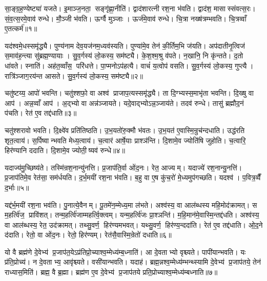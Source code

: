 
\clearpage
{}
\setcounter{anuvakam}{0}
सा॒ङ्ग्र॒ह॒ण्येष्ट्या॑ यजते। इ॒माञ्ज॒नता॒ सङ्गृ॑ह्णा॒नीति॑। द्वाद॑शारत्नी रश॒ना भ॑वति। द्वाद॑श॒ मासास्संवत्स॒रः। सं॒व॒त्स॒रमे॒वाव॑ रुन्धे। मौ॒ञ्जी भ॑वति। ऊर्ग्वै मुञ्जाः। ऊर्ज॑मे॒वाव॑ रुन्धे। चि॒त्रा नख्ष॑त्रम्भवति। चि॒त्रव्वाँ ए॒तत्कर्म॑॥१॥

यद॑श्वमे॒धस्समृ॑द्ध्यै। पुण्य॑नाम देव॒यज॑नम॒ध्यव॑स्यति। पुण्या॑मे॒व तेन॑ की॒र्तिम॒भि ज॑यति। अप॑दातीनृ॒त्विज॑ स॒माव॑ह॒न्त्या सु॑ब्रह्म॒ण्यायाः। सु॒व॒र्गस्य॑ लो॒कस्य॒ सम॑ष्ट्यै। के॒श॒श्म॒श्रु व॑पते। न॒खानि॒ नि कृ॑न्तते। द॒तो धा॑वते। स्नाति॑। अह॑त॒व्वाँस॒ परि॑धत्ते। पा॒प्मनोऽप॑हत्यै। वाचं॑ य॒त्वोप॑ वसति। सु॒व॒र्गस्य॑ लो॒कस्य॒ गुप्त्यै। रात्रि॑ञ्जाग॒रय॑न्त आसते। सु॒व॒र्गस्य॑ लो॒कस्य॒ सम॑ष्ट्यै॥२॥\anuvakamend[कर्म॑ धत्ते॒ पञ्च॑ च]

चतु॑ष्टय्य॒ आपो॑ भवन्ति। चतु॑श्शफो॒ वा अश्व॑ प्राजाप॒त्यस्समृ॑द्ध्यै। ता दि॒ग्भ्यस्स॒माभृ॑ता भवन्ति। दि॒ख्षु वा आप॑। अन्न॒व्वाँ आप॑। अ॒द्भ्यो वा अन्न॑ञ्जायते। यदे॒वाद्भ्योऽन्न॒ञ्जाय॑ते। तदव॑ रुन्धे। तासु॑ ब्रह्मौद॒नं प॑चति। रेत॑ ए॒व तद्द॑धाति॥३॥

चतु॑श्शरावो भवति। दि॒क्ष्वे॑व प्रति॑तिष्ठति। उ॒भ॒यतो॑रु॒क्मौ भ॑वतः। उ॒भ॒यत॑ ए॒वास्मि॒न्रुच॑न्दधाति। उद्ध॑रति शृत॒त्वाय॑। स॒र्पिष्वान्भवति मेध्य॒त्वाय॑। च॒त्वार॑ आर्\mbox{}षे॒याः प्राश्ञ॑न्ति। दि॒शामे॒व ज्योति॑षि जुहोति। च॒त्वारि॒ हिर॑ण्यानि ददाति। दि॒शामे॒व ज्योती॒ष्यव॑ रुन्धे॥४॥

यदाज्य॑मु॒च्छिष्य॑ते। तस्मि॑न्रश॒नान्यु॑नत्ति। प्र॒जाप॑ति॒र्वा ओ॑द॒नः। रेत॒ आज्यम्। यदाज्ये॑ रश॒नान्यु॒नत्ति॑। प्र॒जाप॑तिमे॒व रेत॑सा॒ सम॑र्धयति। द॒र्भ॒मयी॑ रश॒ना भ॑वति। ब॒हु वा ए॒ष कु॑च॒रो॑ मे॒ध्यमुप॑गच्छति। यदश्व॑। प॒वित्र॒व्वैँ द॒र्भाः॥५॥

यद्द॑र्भ॒मयी॑ रश॒ना भव॑ति। पु॒नात्ये॒वैनम्। पू॒तमे॑न॒म्मेध्य॒मा ल॑भते। अश्व॑स्य॒ वा आल॑ब्धस्य महि॒मोद॑क्रामत्। स म॒हर्त्वि॑ज॒ प्रावि॑शत्। तन्म॒हर्त्वि॑जाम्महर्त्वि॒क्त्वम्। यन्म॒हर्त्वि॑जः प्रा॒श्ञन्ति॑। म॒हि॒मान॑मे॒वास्मि॒न्तद्द॑धति। अश्व॑स्य॒ वा आल॑ब्धस्य॒ रेत॒ उद॑क्रामत्। तथ्सु॒वर्ण॒ हिर॑ण्यमभवत्। यथ्सु॒वर्ण॒ हिर॑ण्य॒न्ददा॑ति। रेत॑ ए॒व तद्द॑धाति। ओ॒द॒ने द॑दाति। रेतो॒ वा ओ॑द॒नः। रेतो॒ हिर॑ण्यम्। रेत॑सै॒वास्मि॒न्रेतो॑ दधाति॥६॥\anuvakamend[द॒धा॒ति॒ रु॒न्धे॒ द॒र्भा अ॑भव॒थ्षट् च॑]

यो वै ब्रह्म॑णे दे॒वेभ्य॑ प्र॒जाप॑त॒येऽप्र॑तिप्रो॒च्याश्व॒म्मेध्य॑म्ब॒ध्नाति॑। आ दे॒वताभ्यो वृश्च्यते। पापी॑यान्भवति। यः प्र॑ति॒प्रोच्य॑। न दे॒वताभ्य॒ आवृ॑श्च्यते। वसी॑यान्भवति। यदाह॑। ब्रह्म॒न्नश्व॒म्मेध्य॑म्भन्थ्स्यामि दे॒वेभ्य॑ प्र॒जाप॑तये॒ तेन॑ राध्यास॒मिति॑। ब्रह्म॒ वै ब्र॒ह्मा। ब्रह्म॑ण ए॒व दे॒वेभ्य॑ प्र॒जाप॑तये प्रति॒प्रोच्याश्व॒म्मेध्य॑म्बध्नाति॥७॥

